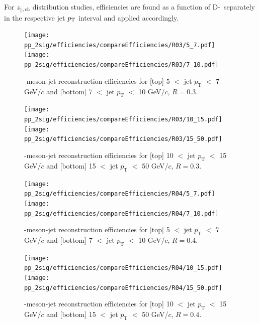 
For $z_{||,\text{ch}}$ distribution studies, efficiencies are found as a function of D-\pt\ separately in the respective jet $p_{\text T}$ interval and applied accordingly. 

\begin{figure}[bth]
\centering
\begin{minipage}{.5\textwidth}
\centering
\texttt{[image: pp\_2sig/efficiencies/compareEfficiencies/R03/5\_7.pdf]}
\texttt{[image: pp\_2sig/efficiencies/compareEfficiencies/R03/7\_10.pdf]}
\caption{\Dzero-meson-jet reconstruction efficiencies for [top] 5 $<$ jet $p_\text{T}$ $<$ 7 GeV/$c$ and [bottom] 7 $<$ jet $p_\text{T}$ $<$ 10 GeV/$c$, $R=0.3$.}
\label{fig:eq_pp_DrecEffR3_1}
\end{minipage}%
\begin{minipage}{.5\textwidth}
\centering
\texttt{[image: pp\_2sig/efficiencies/compareEfficiencies/R03/10\_15.pdf]}
\texttt{[image: pp\_2sig/efficiencies/compareEfficiencies/R03/15\_50.pdf]}
\caption{\Dzero-meson-jet reconstruction efficiencies for [top] 10 $<$ jet $p_\text{T}$ $<$ 15 GeV/$c$ and [bottom] 15 $<$ jet $p_\text{T}$ $<$ 50 GeV/$c$, $R=0.3$.}
\label{fig:eq_pp_DrecEffR3_2}
\end{minipage}%
\end{figure}


\begin{figure}[bth]
\centering
\begin{minipage}{.5\textwidth}
\centering
\texttt{[image: pp\_2sig/efficiencies/compareEfficiencies/R04/5\_7.pdf]}
\texttt{[image: pp\_2sig/efficiencies/compareEfficiencies/R04/7\_10.pdf]}
\caption{\Dzero-meson-jet reconstruction efficiencies for [top] 5 $<$ jet $p_\text{T}$ $<$ 7 GeV/$c$ and [bottom] 7 $<$ jet $p_\text{T}$ $<$ 10 GeV/$c$, $R=0.4$.}
\label{fig:eq_pp_DrecEffR4_1}
\end{minipage}%
\begin{minipage}{.5\textwidth}
\centering
\texttt{[image: pp\_2sig/efficiencies/compareEfficiencies/R04/10\_15.pdf]}
\texttt{[image: pp\_2sig/efficiencies/compareEfficiencies/R04/15\_50.pdf]}
\caption{\Dzero-meson-jet reconstruction efficiencies for [top] 10 $<$ jet $p_\text{T}$ $<$ 15 GeV/$c$ and [bottom] 15 $<$ jet $p_\text{T}$ $<$ 50 GeV/$c$, $R=0.4$.}
\label{fig:eq_pp_DrecEffR4_2}
\end{minipage}%
\end{figure}
